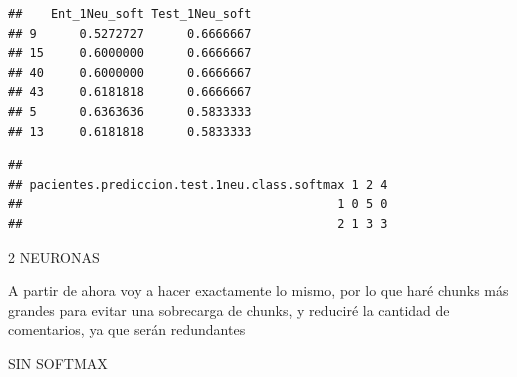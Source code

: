 \documentclass[]{article}
\newenvironment{Shaded}{\begin{snugshade}}{\end{snugshade}}
\newcommand{\CommentTok}[1]{\textcolor[rgb]{0.56,0.35,0.01}{\textit{#1}}}
\newcommand{\DataTypeTok}[1]{\textcolor[rgb]{0.13,0.29,0.53}{#1}}
\newcommand{\DecValTok}[1]{\textcolor[rgb]{0.00,0.00,0.81}{#1}}
\newcommand{\FloatTok}[1]{\textcolor[rgb]{0.00,0.00,0.81}{#1}}
\newcommand{\KeywordTok}[1]{\textcolor[rgb]{0.13,0.29,0.53}{\textbf{#1}}}
\newcommand{\NormalTok}[1]{#1}
\newcommand{\OperatorTok}[1]{\textcolor[rgb]{0.81,0.36,0.00}{\textbf{#1}}}
\newcommand{\StringTok}[1]{\textcolor[rgb]{0.31,0.60,0.02}{#1}}
\begin{document}
\begin{Shaded}
\end{Shaded}

\begin{verbatim}
##    Ent_1Neu_soft Test_1Neu_soft
## 9      0.5272727      0.6666667
## 15     0.6000000      0.6666667
## 40     0.6000000      0.6666667
## 43     0.6181818      0.6666667
## 5      0.6363636      0.5833333
## 13     0.6181818      0.5833333
\end{verbatim}

\begin{Shaded}
\end{Shaded}

\begin{verbatim}
##                                             
## pacientes.prediccion.test.1neu.class.softmax 1 2 4
##                                            1 0 5 0
##                                            2 1 3 3
\end{verbatim}

2 NEURONAS

A partir de ahora voy a hacer exactamente lo mismo, por lo que haré
chunks más grandes para evitar una sobrecarga de chunks, y reduciré la
cantidad de comentarios, ya que serán redundantes

SIN SOFTMAX
\end{document}
